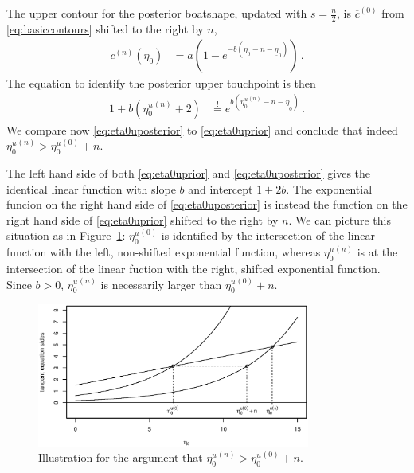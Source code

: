 \documentclass[runningheads,a4paper]{llncs}
\newcommand{\uz}{^{(0)}} %
\newcommand{\un}{^{(n)}} %
\newcommand{\ul}[1]{\underline{#1}}
\newcommand{\ol}[1]{\overline{#1}}
\def\ezl{\ul{\eta}_0}
\def\czu{\ol{c}\uz}
\def\cnu{\ol{c}\un}
\begin{document}
The upper contour for the posterior boatshape,
updated with $s = \frac{n}{2}$, %
is $\czu$ from \eqref{eq:basiccontours} shifted to the right by $n$,
\begin{align*}
\cnu(\eta_0) &= a \left( 1 - e^{-b(\eta_0 - n -\ezl)} \right)\,.
\end{align*}
The equation to identify the posterior upper touchpoint is then
\begin{align}
1 + b({\eta_0^u}\un + 2) &\stackrel{!}{=} e^{b({\eta_0^u}\un - n - \ezl)} \,.
\label{eq:eta0uposterior}
\end{align}
We compare now \eqref{eq:eta0uposterior} to \eqref{eq:eta0uprior} and conclude
that indeed ${\eta_0^u}\un > {\eta_0^u}\uz + n$.

The left hand side of both \eqref{eq:eta0uprior} and \eqref{eq:eta0uposterior}
gives the identical linear function with slope $b$ and intercept $1+2b$. %
The exponential funcion on the right hand side of \eqref{eq:eta0uposterior} is instead the function 
on the right hand side of \eqref{eq:eta0uprior} shifted to the right by $n$.
We can picture this situation as in Figure~\ref{fig:spda1}:
${\eta_0^u}\uz$ is identified by the intersection of the linear function with the left,
non-shifted exponential function,
whereas ${\eta_0^u}\un$ is at the intersection of the linear fuction with the right,
shifted exponential function.
Since $b > 0$, ${\eta_0^u}\un$ is necessarily larger than ${\eta_0^u}\uz + n$.
\begin{figure}  %
\centering
\includegraphics[trim = 1mm 5mm 10mm 20mm, clip, width=0.8\textwidth]{R/prior-vs-posterior-eta0u.eps}%
\caption{Illustration for the argument that ${\eta_0^u}\un > {\eta_0^u}\uz + n$.}
\label{fig:spda1}
\end{figure}
\end{document}
